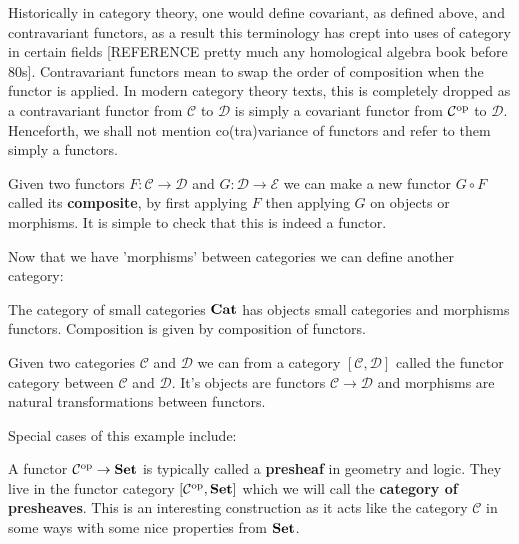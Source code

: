 \begin{remark}
    Historically in category theory, one would define covariant, as defined above, and contravariant functors, as a result this terminology has crept into uses of category in certain fields [REFERENCE pretty much any homological algebra book before 80s]. Contravariant functors mean to swap the order of composition when the functor is applied. In modern category theory texts, this is completely dropped as a contravariant functor from $\mathcal{C}$ to $\mathcal{D}$ is simply a covariant functor from $\mathcal{C}^{\text{op}}$ to $\mathcal{D}$. Henceforth, we shall not mention co(tra)variance of functors and refer to them simply a functors.
\end{remark}

\begin{remark}
    Given two functors $F : \mathcal{C} \to \mathcal{D}$ and $G : \mathcal{D} \to \mathcal{E}$ we can make a new functor $G \circ F$ called its \textbf{composite}, by first applying $F$ then applying $G$ on objects or morphisms. It is simple to check that this is indeed a functor. 
\end{remark}

Now that we have 'morphisms' between categories we can define another category:

\begin{example}
	The category of small categories ${\normalfont\textbf{Cat}}$ has objects small categories and morphisms functors. Composition is given by composition of functors.
\end{example}

\begin{defin}
\end{defin}

\begin{example}
    Given two categories $\mathcal{C}$ and $\mathcal{D}$ we can from a category $[\mathcal{C}, \mathcal{D}]$ called the functor category between $\mathcal{C}$ and $\mathcal{D}$. It's objects are functors $\mathcal{C} \to \mathcal{D}$ and morphisms are natural transformations between functors.
\end{example}

Special cases of this example include:

\begin{example}
    A functor $\mathcal{C}^{\text{op}} \to {\normalfont\textbf{Set}}$ is typically called a \textbf{presheaf} in geometry and logic. They live in the functor category $[\mathcal{C}^{\text{op}}, {\normalfont\textbf{Set}}]$ which we will call the \textbf{category of presheaves}. This is an interesting construction as it acts like the category $\mathcal{C}$ in some ways with some nice properties from ${\normalfont\textbf{Set}}$.
\end{example}

